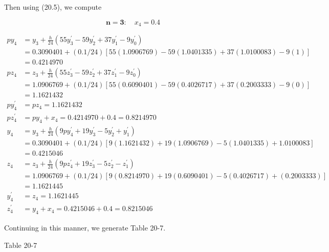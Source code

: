 \documentclass[10pt]{article}
\begin{document}
Then using (20.5), we compute

$$
\boldsymbol{n}=\mathbf{3}: \quad x_{4}=0.4
$$

$$
\begin{aligned}
p y_{4} & =y_{3}+\frac{h}{24}\left(55 y_{3}^{\prime}-59 y_{2}^{\prime}+37 y_{1}^{\prime}-9 y_{0}^{\prime}\right) \\
& =0.3090401+(0.1 / 24)[55(1.0906769)-59(1.0401335)+37(1.0100083)-9(1)] \\
& =0.4214970 \\
p z_{4} & =z_{3}+\frac{h}{24}\left(55 z_{3}^{\prime}-59 z_{2}^{\prime}+37 z_{1}^{\prime}-9 z_{0}^{\prime}\right) \\
& =1.0906769+(0.1 / 24)[55(0.6090401)-59(0.4026717)+37(0.2003333)-9(0)] \\
& =1.1621432 \\
p y_{4}^{\prime} & =p z_{4}=1.1621432 \\
p z_{4}^{\prime} & =p y_{4}+x_{4}=0.4214970+0.4=0.8214970 \\
y_{4} & =y_{3}+\frac{h}{24}\left(9 p y_{4}^{\prime}+19 y_{3}^{\prime}-5 y_{2}^{\prime}+y_{1}^{\prime}\right) \\
& =0.3090401+(0.1 / 24)[9(1.1621432)+19(1.0906769)-5(1.0401335)+1.0100083] \\
& =0.4215046 \\
z_{4} & =z_{3}+\frac{h}{24}\left(9 p z_{4}^{\prime}+19 z_{3}^{\prime}-5 z_{2}^{\prime}-z_{1}^{\prime}\right) \\
& =1.0906769+(0.1 / 24)[9(0.8214970)+19(0.6090401)-5(0.4026717)+(0.2003333)] \\
& =1.1621445 \\
y_{4}^{\prime} & =z_{4}=1.1621445 \\
z_{4}^{\prime} & =y_{4}+x_{4}=0.4215046+0.4=0.8215046
\end{aligned}
$$

Continuing in this manner, we generate Table 20-7.

Table 20-7
\end{document}
